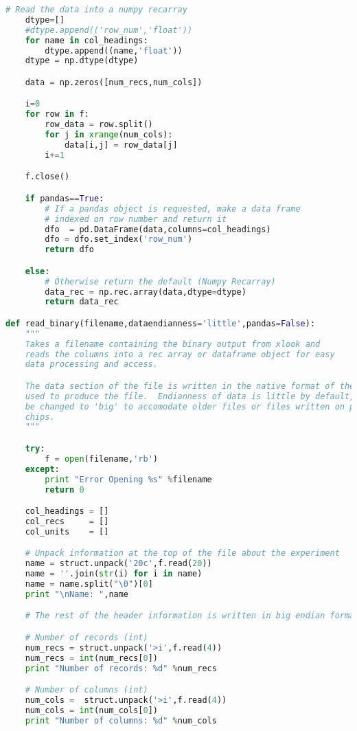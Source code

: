 \begin{lstlisting}[language=Python]
    # Read the data into a numpy recarray
    dtype=[]
    #dtype.append(('row_num','float'))
    for name in col_headings:
        dtype.append((name,'float'))
    dtype = np.dtype(dtype)

    data = np.zeros([num_recs,num_cols])

    i=0
    for row in f:
        row_data = row.split()
        for j in xrange(num_cols):
            data[i,j] = row_data[j]
        i+=1

    f.close()

    if pandas==True:
        # If a pandas object is requested, make a data frame
        # indexed on row number and return it
        dfo  = pd.DataFrame(data,columns=col_headings)
        dfo = dfo.set_index('row_num')
        return dfo

    else:
        # Otherwise return the default (Numpy Recarray)
        data_rec = np.rec.array(data,dtype=dtype)
        return data_rec

def read_binary(filename,dataendianness='little',pandas=False):
    """
    Takes a filename containing the binary output from xlook and
    reads the columns into a rec array or dataframe object for easy
    data processing and access.

    The data section of the file is written in the native format of the machine
    used to produce the file.  Endianness of data is little by default, but may
    be changed to 'big' to accomodate older files or files written on power pc
    chips.
    """

    try:
        f = open(filename,'rb')
    except:
        print "Error Opening %s" %filename
        return 0

    col_headings = []
    col_recs     = []
    col_units    = []

    # Unpack information at the top of the file about the experiment
    name = struct.unpack('20c',f.read(20))
    name = ''.join(str(i) for i in name)
    name = name.split("\0")[0]
    print "\nName: ",name

    # The rest of the header information is written in big endian format

    # Number of records (int)
    num_recs = struct.unpack('>i',f.read(4))
    num_recs = int(num_recs[0])
    print "Number of records: %d" %num_recs

    # Number of columns (int)
    num_cols =  struct.unpack('>i',f.read(4))
    num_cols = int(num_cols[0])
    print "Number of columns: %d" %num_cols


\end{lstlisting}
